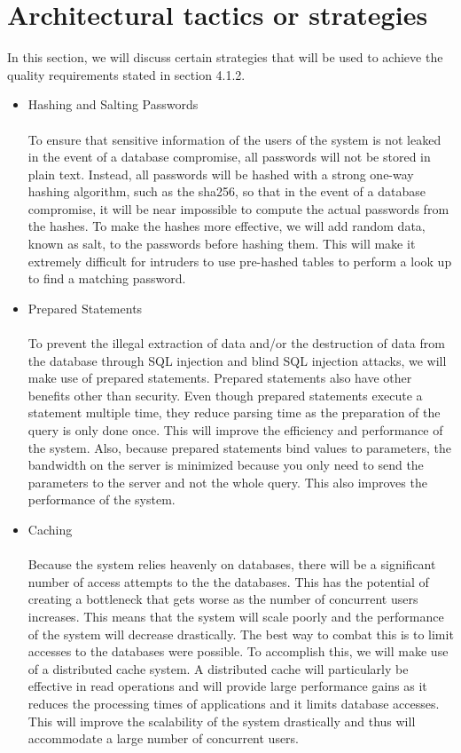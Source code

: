 \documentclass[a4paper]{article}
\begin{document}
\section{Architectural tactics or strategies}
In this section, we will discuss certain strategies that will be used to achieve the quality requirements stated in section 4.1.2.
\begin{itemize}
	\item Hashing and Salting Passwords \\\\
	To ensure that sensitive information of the users of the system is not leaked in the event of a database compromise, all passwords will not be stored in plain text. Instead, all passwords will be hashed with a strong one-way hashing algorithm, such as the sha256, so that in the event of a database compromise, it will be near impossible to compute the actual passwords from the hashes. To make the hashes more effective, we will add random data, known as salt, to the passwords before hashing them. This will make it extremely difficult for intruders to use pre-hashed tables to perform a look up to find a matching password.
	\\
	\item Prepared Statements \\\\
	To prevent the illegal extraction of data and/or the destruction of data from the database through SQL injection and blind SQL injection attacks, we will make use of prepared statements. Prepared statements also have other benefits other than security. Even though prepared statements execute a statement multiple time, they reduce parsing time as the preparation of the query is only done once. This will improve the efficiency and performance of the system. Also, because prepared statements bind values to parameters, the bandwidth on the server is minimized because you only need to send the parameters to the server and not the whole query. This also improves the performance of the system.
	\\
	\item Caching \\\\
	Because the system relies heavenly on databases, there will be a significant number of access attempts to the the databases. This has the potential of creating a bottleneck that gets worse as the number of concurrent users increases. This means that the system will scale poorly and the performance of the system will decrease drastically. The best way to combat this is to limit accesses to the databases were possible. To accomplish this, we will make use of a distributed cache system. A distributed cache will particularly be effective in read operations and will provide large performance gains as it reduces the processing times of applications and it limits database accesses. This will improve the scalability of the system drastically and thus will accommodate a large number of concurrent users. 

\end{itemize}
\end{document}
